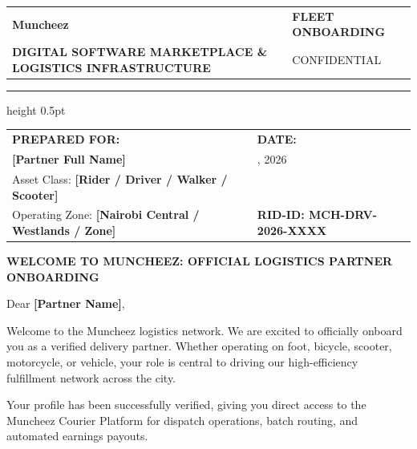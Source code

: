 \documentclass[11pt,a4paper]{article}
\begin{document}
\begin{tabularx}{\textwidth}{@{} X >{\raggedleft\arraybackslash}X @{}}
    {\fontsize{30}{36}\sffamily\bfseries\color{SolidBlack} Muncheez\color{LinkBlue}{\textbf{.}}} & \textsf{\small\bfseries\color{LinkBlue} FLEET ONBOARDING} \\
    {\textsf{\scriptsize\bfseries\color{SolidBlack} DIGITAL SOFTWARE MARKETPLACE \& LOGISTICS INFRASTRUCTURE}} & \textsf{\scriptsize\color{SolidBlack} CONFIDENTIAL} \\
\end{tabularx}

\vspace{0.2cm}
\hrule height 0.5pt
\vspace{0.5cm}

\begin{tabularx}{\textwidth}{@{} X >{\raggedleft\arraybackslash}X @{}}
    \textsf{\small\bfseries\color{SolidBlack} PREPARED FOR:} & \textsf{\small\bfseries\color{SolidBlack} DATE:} \\
    \textsf{\small\color{SolidBlack} \textbf{[Partner Full Name]}} & \textsf{\small\color{SolidBlack} \underline{\hspace{3.0cm}}, 2026} \\[0.05cm]
    \textsf{\small\color{SolidBlack} Asset Class: \textbf{[Rider / Driver / Walker / Scooter]}} & \\
    \textsf{\small\color{SolidBlack} Operating Zone: \textbf{[Nairobi Central / Westlands / Zone]}} & \textsf{\small\bfseries\color{LinkBlue} RID-ID: MCH-DRV-2026-XXXX} \\
\end{tabularx}

\vspace{0.5cm}

{\fontsize{13}{16}\sffamily\bfseries\color{SolidBlack} WELCOME TO MUNCHEEZ: OFFICIAL LOGISTICS PARTNER ONBOARDING}

\vspace{0.4cm}

Dear \textbf{[Partner Name]},

Welcome to the Muncheez logistics network. We are excited to officially onboard you as a verified delivery partner. Whether operating on foot, bicycle, scooter, motorcycle, or vehicle, your role is central to driving our high-efficiency fulfillment network across the city.

Your profile has been successfully verified, giving you direct access to the Muncheez Courier Platform for dispatch operations, batch routing, and automated earnings payouts.
\end{document}
